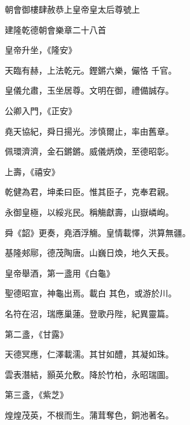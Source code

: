 
\begin{pinyinscope}

 朝會御樓肆赦恭上皇帝皇太后尊號上



 建隆乾德朝會樂章二十八首



 皇帝升坐，《隆安》



 天臨有赫，上法乾元。鏗鏘六樂，儼恪
 千官。



 皇儀允肅，玉坐居尊。文明在御，禮備誠存。



 公卿入門，《正安》



 堯天協紀，舜日揚光。涉慎爾止，率由舊章。



 佩環濟濟，金石鏘鏘。威儀炳煥，至德昭彰。



 上壽，《禧安》



 乾健為君，坤柔曰臣。惟其臣子，克奉君親。



 永御皇極，以綏兆民。稱觴獻壽，山嶽嶙峋。



 舜《韶》更奏，堯酒浮觴。皇情載懌，洪算無疆。



 基隆郟鄏，德茂陶唐。山巍日煥，地久天長。



 皇帝舉酒，第一盞用《白龜》



 聖德昭宣，神龜出焉。載白
 其色，或游於川。



 名符在沼，瑞應巢蓮。登歌丹陛，紀異靈篇。



 第二盞，《甘露》



 天德冥應，仁澤載濡。其甘如醴，其凝如珠。



 雲表潛結，顥英允敷。降於竹柏，永昭瑞圖。



 第三盞，《紫芝》



 煌煌茂英，不根而生。蒲茸奪色，銅池著名。




\end{pinyinscope}
